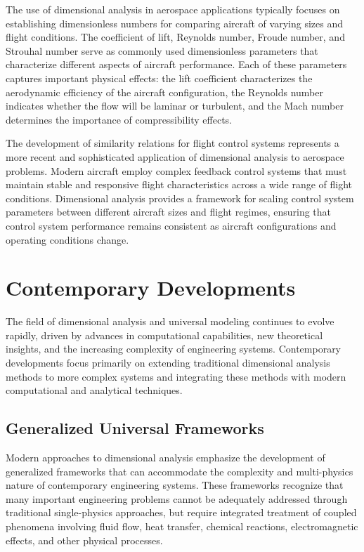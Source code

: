 \documentclass[
	11pt, %
	fleqn, %
	a4paper, %
]{LegrandOrangeBook}
\begin{document}
The use of dimensional analysis in aerospace applications typically focuses on establishing dimensionless numbers for comparing aircraft of varying sizes and flight conditions. The coefficient of lift, Reynolds number, Froude number, and Strouhal number serve as commonly used dimensionless parameters that characterize different aspects of aircraft performance. Each of these parameters captures important physical effects: the lift coefficient characterizes the aerodynamic efficiency of the aircraft configuration, the Reynolds number indicates whether the flow will be laminar or turbulent, and the Mach number determines the importance of compressibility effects.

The development of similarity relations for flight control systems represents a more recent and sophisticated application of dimensional analysis to aerospace problems. Modern aircraft employ complex feedback control systems that must maintain stable and responsive flight characteristics across a wide range of flight conditions. Dimensional analysis provides a framework for scaling control system parameters between different aircraft sizes and flight regimes, ensuring that control system performance remains consistent as aircraft configurations and operating conditions change.

\section{Contemporary Developments}

The field of dimensional analysis and universal modeling continues to evolve rapidly, driven by advances in computational capabilities, new theoretical insights, and the increasing complexity of engineering systems. Contemporary developments focus primarily on extending traditional dimensional analysis methods to more complex systems and integrating these methods with modern computational and analytical techniques.

\subsection{Generalized Universal Frameworks}

Modern approaches to dimensional analysis emphasize the development of generalized frameworks that can accommodate the complexity and multi-physics nature of contemporary engineering systems. These frameworks recognize that many important engineering problems cannot be adequately addressed through traditional single-physics approaches, but require integrated treatment of coupled phenomena involving fluid flow, heat transfer, chemical reactions, electromagnetic effects, and other physical processes.
\end{document}
